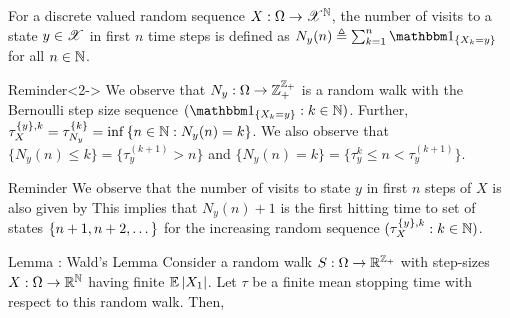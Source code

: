 \documentclass[12pt,aspectratio=169]{beamer}
\begin{document}
\begin{frame}
\begin{Definition} 
For a discrete valued random sequence $X:\Omega\to\mathscr{X}^{\mathbb{N}}$, the number of visits to a state $y \in \mathscr{X}$ in first $n$ time steps is defined as $N_y(n) \triangleq \sum_{k=1}^n\SetIn{X_k = y}$ for all $n \in \mathbb{N}$. 
\end{Definition}
\begin{block}{Reminder}<2->
We observe that $N_y:\Omega\to\mathbb{Z}_+^{\mathbb{Z}_+}$ is a random walk with the Bernoulli step size sequence $(\SetIn{X_k = y}: k \in \N)$. 
Further, $\tau_X^{\left\{y\right\}, k} = \tau_{N_y}^{\left\{k\right\}} = \inf\left\{n \in \mathbb{N}: N_y(n) = k\right\}$. 
We also observe that $\{N_y(n) \le k\} = \{\tau_y^{(k+1)} > n\}$ and $\{N_y(n) = k\} = \{\tau_y^{k} \le n < \tau_y^{(k+1)}\}$. 
\end{block}
\end{frame}

\begin{frame}
\begin{block}{Reminder}
We observe that the number of visits to state $y$ in first $n$ steps of $X$ is also given by 
This implies that $N_y(n)+1$ is the first hitting time to set of states $\left\{n+1, n+2, \dots \right\}$ for the increasing random sequence $(\tau_X^{\left\{y\right\},k}:k \in \mathbb{N})$. 
\end{block}
\end{frame}


\begin{frame}
\begin{block}{Lemma : Wald's Lemma} 
Consider a random walk $S: \Omega \to \mathbb{R}^{\mathbb{Z}_+}$ with \iid step-sizes $X: \Omega \to  \mathbb{R}^{\mathbb{N}}$ having finite $\mathbb{E}\left\lvert X_1\right\rvert$. 
Let $\tau$ be a finite mean stopping time with respect to this random walk. 
Then,
\end{block}
\end{frame}
\end{document}
